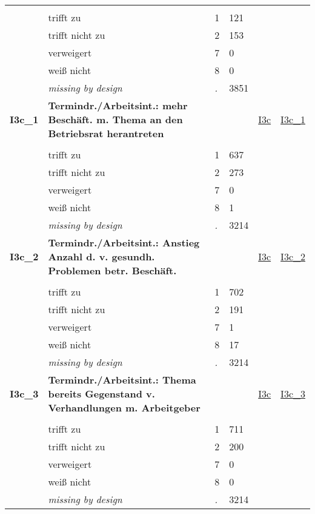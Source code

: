 \begin{longtable}{| L{2.45cm} | L{6cm} | C{1.5cm} | R{1cm} | C{2.25cm} | C{2.25cm} |}
   &  &  &  &  &  \\ 
   & trifft zu & 1 & 121 &  &  \\ 
   & trifft nicht zu & 2 & 153 &  &  \\ 
   & verweigert & 7 & 0 &  &  \\ 
   & weiß nicht & 8 & 0 &  &  \\ 
   & \textit{missing by design} & \textit{.} & 3851 &  &  \\ 
   \midrule
\textbf{I3c\_1}\label{var:I3c:1} & \textbf{Termindr./Arbeitsint.: mehr Beschäft. m. Thema an den Betriebsrat herantreten} &  &  & \hyperref[I3c]{I3c} & \hyperref[var:suf:I3c:1]{I3c\_1} \\ 
   &  &  &  &  &  \\ 
   & trifft zu & 1 & 637 &  &  \\ 
   & trifft nicht zu & 2 & 273 &  &  \\ 
   & verweigert & 7 & 0 &  &  \\ 
   & weiß nicht & 8 & 1 &  &  \\ 
   & \textit{missing by design} & \textit{.} & 3214 &  &  \\ 
   \midrule
\textbf{I3c\_2}\label{var:I3c:2} & \textbf{Termindr./Arbeitsint.: Anstieg Anzahl d. v. gesundh. Problemen betr. Beschäft.} &  &  & \hyperref[I3c]{I3c} & \hyperref[var:suf:I3c:2]{I3c\_2} \\ 
   &  &  &  &  &  \\ 
   & trifft zu & 1 & 702 &  &  \\ 
   & trifft nicht zu & 2 & 191 &  &  \\ 
   & verweigert & 7 & 1 &  &  \\ 
   & weiß nicht & 8 & 17 &  &  \\ 
   & \textit{missing by design} & \textit{.} & 3214 &  &  \\ 
   \midrule
\textbf{I3c\_3}\label{var:I3c:3} & \textbf{Termindr./Arbeitsint.: Thema bereits Gegenstand v. Verhandlungen m. Arbeitgeber} &  &  & \hyperref[I3c]{I3c} & \hyperref[var:suf:I3c:3]{I3c\_3} \\ 
   &  &  &  &  &  \\ 
   & trifft zu & 1 & 711 &  &  \\ 
   & trifft nicht zu & 2 & 200 &  &  \\ 
   & verweigert & 7 & 0 &  &  \\ 
   & weiß nicht & 8 & 0 &  &  \\ 
   & \textit{missing by design} & \textit{.} & 3214 &  &  \\ 

\end{longtable}

